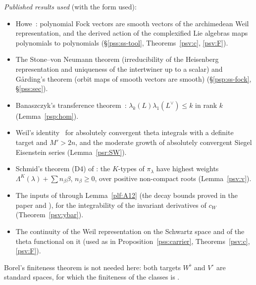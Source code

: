 \documentclass[10pt]{amsart}
\theoremstyle{definition}
\theoremstyle{remark}
\begin{document}
\emph{Published results used} (with the form used):
\begin{itemize}
\item Howe~\cite[(2.2)--(2.3)]{HoweJAMS}: polynomial Fock vectors are smooth vectors of the archimedean Weil
representation, and the derived action of the complexified Lie algebras maps polynomials to polynomials
(\S\ref{pss:ss-tool}, Theorems~\ref{psv:c}, \ref{psv:F}).
\item The Stone--von Neumann theorem (irreducibility of the Heisenberg representation and uniqueness of the
intertwiner up to a scalar) and G\aa rding's theorem (orbit maps of smooth vectors are smooth)
(\S\ref{psp:ss-fock}, \S\ref{pss:sec}).
\item Banaszczyk's transference theorem~\cite[Theorem~2.1]{Banaszczyk}: $\lambda_k(L)\lambda_1(L^\vee)\le k$ in rank $k$
(Lemma~\ref{psp:hom}).
\item Weil's identity~\cite{WeilSiegel} for absolutely convergent theta integrals with a definite target and
$M'>2n$, and the moderate growth of absolutely convergent Siegel Eisenstein series (Lemma~\ref{psr:SW}).
\item Schmid's theorem (D4) of {\cite[\S4.2.3]{P53}}: the $K$-types of $\pi_\lambda$ have highest weights
$\Lambda^K(\lambda)+\sum n_\beta\beta$, $n_\beta\ge0$, over positive non-compact roots (Lemma~\ref{psv:v}).
\item The inputs of {\cite[Theorem~3.2]{P49}} through Lemma~\ref{plf:A12} (the decay bounds proved in the paper and
{\cite[Lemma~4.7]{P51}}), for the integrability of the invariant derivatives of $c_W$ (Theorem~\ref{psv:ybar}).
\item The continuity of the Weil representation on the Schwartz space and of the theta functional on it (used as in
Proposition~\ref{pss:carrier}, Theorems~\ref{psv:c}, \ref{psv:F}).
\end{itemize}
Borel's finiteness theorem is not needed here: both targets $W^\flat$ and $V^\circ$ are standard spaces, for which
the finiteness of the classes is {\cite[Proposition~7.20]{P49}}.
\end{document}
